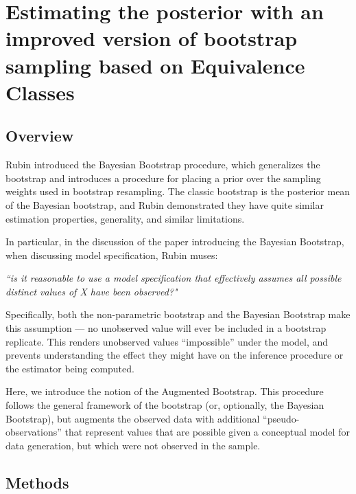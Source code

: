 
\renewcommand{\thechapter}{4}

\chapter[Improving the Posterior Estimates]{Estimating the posterior with an improved 
version of bootstrap sampling based on Equivalence Classes} 
\label{chapt4}

\section{Overview}
Rubin \cite{rubin1981bayesian} introduced the Bayesian Bootstrap procedure, which generalizes 
the bootstrap and introduces a procedure for placing a prior over the sampling weights used in 
bootstrap resampling. The classic bootstrap is the posterior mean of the Bayesian bootstrap, and 
Rubin demonstrated they have quite similar estimation properties, generality, and similar 
limitations.

In particular, in the discussion of the paper introducing the Bayesian Bootstrap, when 
discussing model specification, Rubin muses:

\textit{``is it reasonable to use a model specification that effectively assumes all possible distinct 
values of X have been observed?"}

Specifically, both the non-parametric bootstrap and the Bayesian Bootstrap make this assumption — 
no unobserved value will ever be included in a bootstrap replicate. This renders unobserved 
values “impossible” under the model, and prevents understanding the effect they might have on 
the inference procedure or the estimator being computed.

Here, we introduce the notion of the Augmented Bootstrap. This procedure follows the general 
framework of the bootstrap (or, optionally, the Bayesian Bootstrap), but augments the observed 
data with additional ``pseudo-observations'' that represent values that are possible given a 
conceptual model for data generation, but which were not observed in the sample.

\section{Methods}

